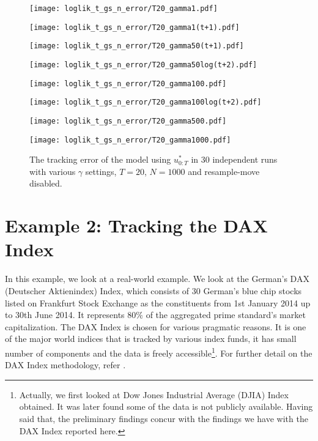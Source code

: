 \begin{figure}[!thbp]
    \centering
    \begin{minipage}{.5\textwidth}
        \centering
        \texttt{[image: loglik\_t\_gs\_n\_error/T20\_gamma1.pdf]}
    \end{minipage}%
    \begin{minipage}{0.5\textwidth}
        \centering
        \texttt{[image: loglik\_t\_gs\_n\_error/T20\_gamma1(t+1).pdf]}
    \end{minipage}
    \begin{minipage}{0.5\textwidth}
        \centering
        \texttt{[image: loglik\_t\_gs\_n\_error/T20\_gamma50(t+1).pdf]}
    \end{minipage}%
    \begin{minipage}{0.5\textwidth}
        \centering
        \texttt{[image: loglik\_t\_gs\_n\_error/T20\_gamma50log(t+2).pdf]}
    \end{minipage}
    \begin{minipage}{0.5\textwidth}
        \centering
        \texttt{[image: loglik\_t\_gs\_n\_error/T20\_gamma100.pdf]}
    \end{minipage}%
    \begin{minipage}{0.5\textwidth}
        \centering
        \texttt{[image: loglik\_t\_gs\_n\_error/T20\_gamma100log(t+2).pdf]}
    \end{minipage}
    \begin{minipage}{0.5\textwidth}
        \centering
        \texttt{[image: loglik\_t\_gs\_n\_error/T20\_gamma500.pdf]}
    \end{minipage}%
    \begin{minipage}{0.5\textwidth}
        \centering
        \texttt{[image: loglik\_t\_gs\_n\_error/T20\_gamma1000.pdf]}
    \end{minipage}
    \caption{The tracking error of the model using $u^*_{0:T}$ in 30 independent runs with various $\gamma$ settings, $T=20$, $N=1000$ and resample-move disabled.}
    \label{fig:error}
\end{figure}

\section{Example 2: Tracking the DAX Index}
\label{sec:exp2}
In this example, we look at a real-world example. We look at the German's DAX (Deutscher Aktienindex) Index, which consists of 30 German's blue chip stocks listed on Frankfurt Stock Exchange as the constituents from 1st January 2014 up to 30th June 2014. It represents $80\%$ of the aggregated prime standard's market capitalization. The DAX Index is chosen for various pragmatic reasons. It is one of the major world indices that is tracked by various index funds, it has small number of components and the data is freely accessible\footnote{Actually, we first looked at Dow Jones Industrial Average (DJIA) Index obtained. It was later found some of the data is not publicly available. Having said that, the preliminary findings concur with the findings we have with the DAX Index reported here.}. For further detail on the DAX Index methodology, refer \cite{DAX14}.
 
